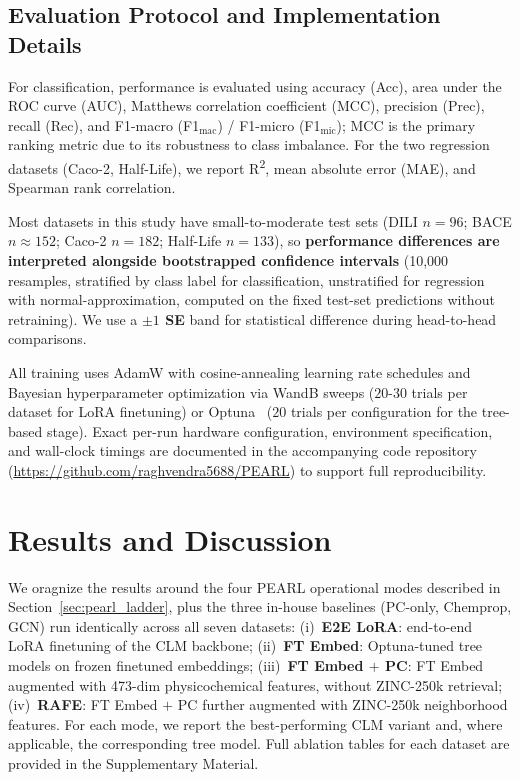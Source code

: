 \documentclass[pdflatex,sn-mathphys-num]{sn-jnl}%
\begin{document}
\subsection{Evaluation Protocol and Implementation Details}\label{sec:eval_protocol}
For classification, performance is evaluated using accuracy (Acc), area under the ROC curve (AUC), Matthews correlation coefficient (MCC), precision (Prec), recall (Rec), and F1-macro (F1$_\text{mac}$) / F1-micro (F1$_\text{mic}$); MCC is the primary ranking metric due to its robustness to class imbalance. For the two regression datasets (Caco-2, Half-Life), we report R\textsuperscript{2}, mean absolute error (MAE), and Spearman rank correlation.

Most datasets in this study have small-to-moderate test sets (DILI $n=96$; BACE $n\approx152$; Caco-2 $n=182$; Half-Life $n=133$), so \textbf{performance differences are interpreted alongside bootstrapped confidence intervals} (10{,}000 resamples, stratified by class label for classification, unstratified for regression with normal-approximation, computed on the fixed test-set predictions without retraining). We use a \textbf{$\pm 1$ SE} band for statistical difference during head-to-head comparisons.

All training uses AdamW with cosine-annealing learning rate schedules and Bayesian hyperparameter optimization via WandB sweeps ($20$-$30$ trials per dataset for LoRA finetuning) or Optuna~\cite{akiba2019optuna} ($20$ trials per configuration for the tree-based stage). Exact per-run hardware configuration, environment specification, and wall-clock timings are documented in the accompanying code repository (\url{https://github.com/raghvendra5688/PEARL}) to support full reproducibility.

\section{Results and Discussion}\label{sec:results_discussion}

We oragnize the results around the four PEARL operational modes described in Section~\ref{sec:pearl_ladder}, plus the three in-house baselines (PC-only, Chemprop, GCN) run identically across all seven datasets: (i)~\textbf{E2E LoRA}: end-to-end LoRA finetuning of the CLM backbone; (ii)~\textbf{FT Embed}: Optuna-tuned tree models on frozen finetuned embeddings; (iii)~\textbf{FT Embed $+$ PC}: FT Embed augmented with 473-dim physicochemical features, without ZINC-250k retrieval; (iv)~\textbf{RAFE}: FT Embed $+$ PC further augmented with ZINC-250k neighborhood features. For each mode, we report the best-performing CLM variant and, where applicable, the corresponding tree model. Full ablation tables for each dataset are provided in the Supplementary Material.
\end{document}
